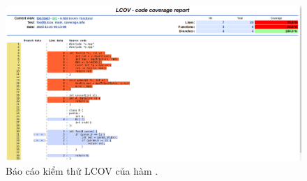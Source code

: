 \begin{figure}[h]
    \centering
    \includegraphics[width=\linewidth]{images/report.png}
    \caption{Báo cáo kiểm thử LCOV của hàm .}
    \label{fig:report}
\end{figure}

%     

